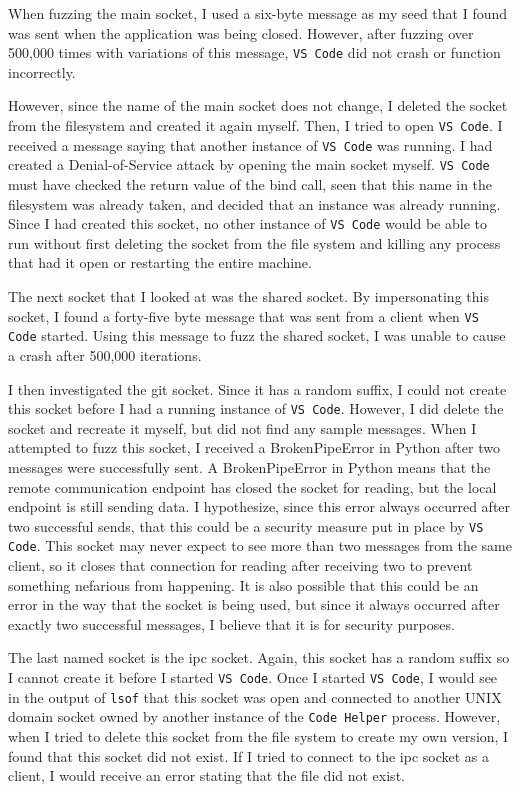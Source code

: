 When fuzzing the main socket, I used a six-byte message as my seed that I found was sent when the application was being closed.  However, after fuzzing over 500,000 times with variations of this message, \texttt{VS Code} did not crash or function incorrectly.

However, since the name of the main socket does not change, I deleted the socket from the filesystem and created it again myself.  Then, I tried to open \texttt{VS Code}.  I received a message saying that another instance of \texttt{VS Code} was running.  I had created a Denial-of-Service attack by opening the main socket myself.  \texttt{VS Code} must have checked the return value of the bind call, seen that this name in the filesystem was already taken, and decided that an instance was already running.  Since I had created this socket, no other instance of \texttt{VS Code} would be able to run without first deleting the socket from the file system and killing any process that had it open or restarting the entire machine.

The next socket that I looked at was the shared socket.  By impersonating this socket, I found a forty-five byte message that was sent from a client when \texttt{VS Code} started.  Using this message to fuzz the shared socket, I was unable to cause a crash after 500,000 iterations.

I then investigated the git socket.  Since it has a random suffix, I could not create this socket before I had a running instance of \texttt{VS Code}.  However, I did delete the socket and recreate it myself, but did not find any sample messages.  When I attempted to fuzz this socket, I received a BrokenPipeError in Python after two messages were successfully sent.  A BrokenPipeError in Python means that the remote communication endpoint has closed the socket for reading, but the local endpoint is still sending data.  I hypothesize, since this error always occurred after two successful sends, that this could be a security measure put in place by \texttt{VS Code}.  This socket may never expect to see more than two messages from the same client, so it closes that connection for reading after receiving two to prevent something nefarious from happening.  It is also possible that this could be an error in the way that the socket is being used, but since it always occurred after exactly two successful messages, I believe that it is for security purposes.

The last named socket is the ipc socket.  Again, this socket has a random suffix so I cannot create it before I started \texttt{VS Code}.  Once I started \texttt{VS Code}, I would see in the output of \texttt{lsof} that this socket was open and connected to another UNIX domain socket owned by another instance of the \texttt{Code Helper} process.  However, when I tried to delete this socket from the file system to create my own version, I found that this socket did not exist.  If I tried to connect to the ipc socket as a client, I would receive an error stating that the file did not exist.

